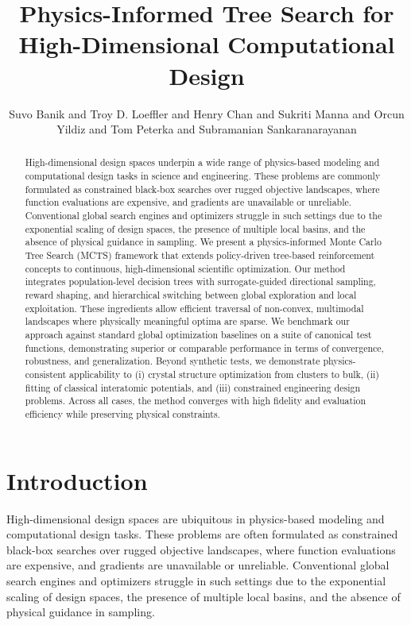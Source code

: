 \documentclass{article}
\title{Physics-Informed Tree Search for High-Dimensional Computational Design}
\author{Suvo Banik and Troy D. Loeffler and Henry Chan and Sukriti Manna and Orcun Yildiz and Tom Peterka and Subramanian Sankaranarayanan}
\begin{document}
\maketitle

\begin{abstract}
High-dimensional design spaces underpin a wide range of physics-based modeling and computational design tasks in science and engineering. These problems are commonly formulated as constrained black-box searches over rugged objective landscapes, where function evaluations are expensive, and gradients are unavailable or unreliable. Conventional global search engines and optimizers struggle in such settings due to the exponential scaling of design spaces, the presence of multiple local basins, and the absence of physical guidance in sampling. We present a physics-informed Monte Carlo Tree Search (MCTS) framework that extends policy-driven tree-based reinforcement concepts to continuous, high-dimensional scientific optimization. Our method integrates population-level decision trees with surrogate-guided directional sampling, reward shaping, and hierarchical switching between global exploration and local exploitation. These ingredients allow efficient traversal of non-convex, multimodal landscapes where physically meaningful optima are sparse. We benchmark our approach against standard global optimization baselines on a suite of canonical test functions, demonstrating superior or comparable performance in terms of convergence, robustness, and generalization. Beyond synthetic tests, we demonstrate physics-consistent applicability to (i) crystal structure optimization from clusters to bulk, (ii) fitting of classical interatomic potentials, and (iii) constrained engineering design problems. Across all cases, the method converges with high fidelity and evaluation efficiency while preserving physical constraints.
\end{abstract}

\section{Introduction}
High-dimensional design spaces are ubiquitous in physics-based modeling and computational design tasks. These problems are often formulated as constrained black-box searches over rugged objective landscapes, where function evaluations are expensive, and gradients are unavailable or unreliable. Conventional global search engines and optimizers struggle in such settings due to the exponential scaling of design spaces, the presence of multiple local basins, and the absence of physical guidance in sampling.
\end{document}
